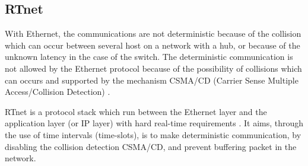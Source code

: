 \documentclass[conference]{IEEEtran}
\begin{document}
\subsection{RTnet}\label{subsec:rtnet}

With Ethernet, the communications are not deterministic because of the collision which can occur between several host on a network with a hub, or because of the unknown latency in the case of the switch. The deterministic communication is not allowed by the Ethernet protocol because of the possibility of collisions which can occurs and supported by the mechanism CSMA/CD (Carrier Sense Multiple Access/Collision Detection) \cite{rtnet_IEEE_so53551}.

RTnet is a protocol stack which run between the Ethernet layer and the application layer (or IP layer) with hard real-time requirements \cite{rtnet_org}. It aims, through the use of time intervals (time-slots), is to make deterministic communication, by disabling the collision detection CSMA/CD, and prevent buffering packet in the network. 




\end{document}
